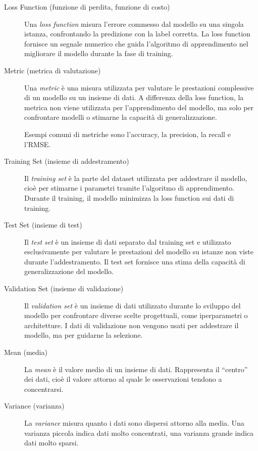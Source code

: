 \documentclass[a4paper,12pt]{report}
\begin{document}
\begin{description}
    \item[Loss Function (funzione di perdita, funzione di costo)]
Una \emph{loss function} misura l’errore commesso dal modello su una singola
istanza, confrontando la predizione con la label corretta.
La loss function fornisce un segnale numerico che guida l’algoritmo di
apprendimento nel migliorare il modello durante la fase di training.

    \item[Metric (metrica di valutazione)]
Una \emph{metric} è una misura utilizzata per valutare le prestazioni complessive
di un modello su un insieme di dati.
A differenza della loss function, la metrica non viene utilizzata per
l’apprendimento del modello, ma solo per confrontare modelli o stimarne
la capacità di generalizzazione.

Esempi comuni di metriche sono l’accuracy, la precision, la recall e l’RMSE.

    \item[Training Set (insieme di addestramento)]
Il \emph{training set} è la parte del dataset utilizzata per addestrare il modello,
cioè per stimarne i parametri tramite l’algoritmo di apprendimento.
Durante il training, il modello minimizza la loss function sui dati di training.

    \item[Test Set (insieme di test)]
Il \emph{test set} è un insieme di dati separato dal training set e utilizzato
esclusivamente per valutare le prestazioni del modello su istanze non viste
durante l’addestramento.
Il test set fornisce una stima della capacità di generalizzazione del modello.

    \item[Validation Set (insieme di validazione)]
Il \emph{validation set} è un insieme di dati utilizzato durante lo sviluppo del
modello per confrontare diverse scelte progettuali, come iperparametri o architetture.
I dati di validazione non vengono usati per addestrare il modello, ma per guidarne
la selezione.

    \item[Mean (media)]
La \emph{mean} è il valore medio di un insieme di dati.
Rappresenta il “centro” dei dati, cioè il valore attorno al quale le osservazioni
tendono a concentrarsi.

    \item[Variance (varianza)]
La \emph{variance} misura quanto i dati sono dispersi attorno alla media.
Una varianza piccola indica dati molto concentrati, una varianza grande indica
dati molto sparsi.


\end{description}
\end{document}

